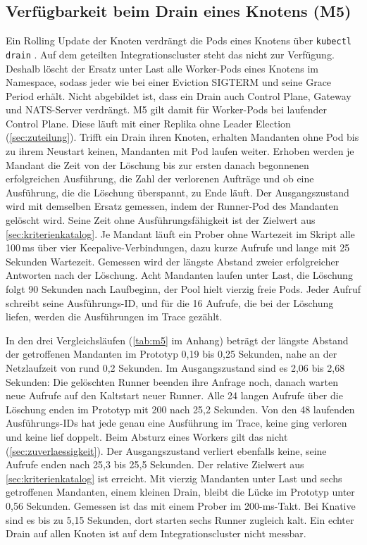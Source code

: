 \subsection{Verfügbarkeit beim Drain eines Knotens (M5)}
\label{sec:pruefung-m5}

Ein Rolling Update der Knoten verdrängt die Pods eines Knotens über \texttt{kubectl drain}
\autocite{the_kubernetes_authors_safely_2026}. Auf dem geteilten Integrationscluster steht das nicht zur Verfügung.
Deshalb löscht der Ersatz unter Last alle Worker-Pods eines Knotens im Namespace, sodass jeder wie bei einer Eviction
SIGTERM und seine Grace Period erhält. Nicht abgebildet
ist, dass ein Drain auch Control Plane, Gateway und NATS-Server verdrängt. M5 gilt damit für Worker-Pods bei laufender
Control Plane. Diese läuft mit einer Replika ohne Leader Election (\autoref{sec:zuteilung}). Trifft ein Drain ihren
Knoten, erhalten Mandanten ohne Pod bis zu ihrem Neustart keinen, Mandanten mit Pod laufen weiter. Erhoben werden je Mandant die Zeit von der Löschung bis zur ersten danach
begonnenen erfolgreichen Ausführung, die Zahl der verlorenen Aufträge und ob eine Ausführung, die die Löschung
überspannt, zu Ende läuft. Der Ausgangszustand wird mit demselben Ersatz gemessen, indem der Runner-Pod des Mandanten
gelöscht wird. Seine Zeit ohne Ausführungsfähigkeit ist der Zielwert aus \autoref{sec:kriterienkatalog}. Je Mandant läuft ein Prober ohne
Wartezeit im Skript alle 100\,ms über vier Keepalive-Verbindungen, dazu kurze Aufrufe und lange mit 25 Sekunden Wartezeit. Gemessen wird der
längste Abstand zweier erfolgreicher Antworten nach der Löschung. Acht Mandanten laufen unter Last, die Löschung folgt 90 Sekunden nach Laufbeginn, der Pool
hielt vierzig freie Pods. Jeder Aufruf schreibt seine Ausführungs-ID, und für die 16 Aufrufe, die bei der Löschung liefen, werden die
Ausführungen im Trace gezählt.

In den drei Vergleichsläufen (\autoref{tab:m5} im Anhang) beträgt der längste Abstand der getroffenen Mandanten im Prototyp
0,19 bis 0,25 Sekunden, nahe an der Netzlaufzeit von rund 0,2 Sekunden. Im Ausgangszustand sind es 2,06 bis 2,68 Sekunden: Die
gelöschten Runner beenden ihre Anfrage noch, danach warten neue Aufrufe auf den Kaltstart neuer Runner. Alle 24 langen Aufrufe über die Löschung enden im Prototyp
mit 200 nach 25,2 Sekunden. Von den 48 laufenden Ausführungs-IDs hat jede genau eine Ausführung im Trace, keine ging verloren und
keine lief doppelt. Beim Absturz eines Workers gilt das nicht (\autoref{sec:zuverlaessigkeit}). Der Ausgangszustand verliert ebenfalls keine, seine Aufrufe enden nach 25,3 bis 25,5 Sekunden.
Der relative Zielwert aus \autoref{sec:kriterienkatalog} ist erreicht. Mit vierzig Mandanten unter Last und sechs
getroffenen Mandanten, einem kleinen Drain, bleibt die Lücke im Prototyp unter 0,56 Sekunden. Gemessen ist das mit einem
Prober im 200-ms-Takt. Bei Knative sind es bis zu 5,15 Sekunden, dort starten sechs Runner zugleich kalt. Ein echter Drain auf allen Knoten ist auf dem
Integrationscluster nicht messbar.


